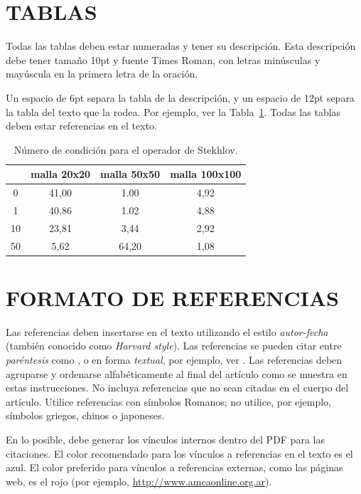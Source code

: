\documentclass[oneside,a4paper,spanish,links]{amca}
\begin{document}
\section{TABLAS}

Todas las tablas deben estar numeradas y tener su descripción.
Esta descripción debe tener tamaño 10pt y fuente Times Roman, con
letras minúsculas y mayúscula en la primera letra de la oración.

Un espacio de 6pt separa la tabla de la descripción, y un espacio de 12pt
separa la tabla del texto que la rodea. Por ejemplo, ver la
Tabla~\ref{tab:n50}. Todas las tablas deben estar referencias en el texto.

\begin{table}[htb]
\centering
\begin{tabular}{|c|c|c|c|}
\hline  & malla 20x20  & malla 50x50  & malla 100x100 \\
\hline
\hline
 0 & 41,00 & 1.00 & 4,92\\
\hline
 1 & 40,86 & 1.02 & 4,88 \\
\hline
10 & 23,81 & 3,44 & 2,92 \\
\hline
50 & 5,62 & 64,20 & 1,08 \\
\hline
\end{tabular}
\caption{Número de condición para el operador de Stekhlov.}
\label{tab:n50}
\end{table}

\section{FORMATO DE  REFERENCIAS}

Las referencias deben insertarse en el texto utilizando el estilo
\emph{autor-fecha} (también conocido como \emph{Harvard style}).
Las referencias se pueden citar entre \emph{paréntesis} como
\citep{zienkiewicz91,idelsohn94,meyer82,meyer82b},
 o en forma \emph{textual}, por ejemplo, ver
\citet{zienkiewicz91,idelsohn94,meyer82,meyer82b}. Las referencias
deben agruparse y ordenarse alfabéticamente al final del artículo
como se muestra en estas instrucciones. No incluya referencias que
no sean citadas en el cuerpo del artículo. Utilice referencias con
símbolos Romanos; no utilice, por ejemplo, símbolos griegos,
chinos o japoneses.

En lo posible, debe generar los vínculos internos dentro del PDF para las citaciones.
El color recomendado para los vínculos a referencias en el texto es el azul.
El color preferido para vínculos a referencias externas, como las páginas web,
 es el rojo (por ejemplo, \url{http://www.amcaonline.org.ar}).
\end{document}
